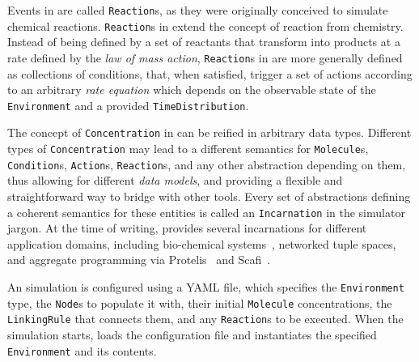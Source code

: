 Events in \alchemist{} are called \texttt{Reaction}s,
as they were originally conceived to simulate chemical reactions.
%
\texttt{Reaction}s in \alchemist{} extend the concept of reaction from chemistry.
%
Instead of being defined by a set of reactants that
transform into products at a rate defined by the \emph{law of mass action},
\texttt{Reaction}s in \alchemist{} are more generally defined as
collections of conditions, that, when satisfied,
trigger a set of actions according to an arbitrary \emph{rate equation}
which depends on the observable state of the \texttt{Environment}
and a provided \texttt{TimeDistribution}.

The concept of \texttt{Concentration} in \alchemist{} can be reified
in arbitrary data types.
Different types of \texttt{Concentration} may lead to a different semantics
for \texttt{Molecule}s, \texttt{Condition}s, \texttt{Action}s, \texttt{Reaction}s,
and any other abstraction depending on them,
thus allowing for different \emph{data models},
and providing a flexible and straightforward way to
bridge \alchemist{} with other tools.
%
Every set of abstractions defining a coherent semantics
for these entities is called an \texttt{Incarnation}
in the simulator jargon.
%
At the time of writing,
\alchemist{} provides several incarnations
for different application domains,
including
bio-chemical systems~\cite{MontagnaSAC2012},
networked tuple spaces\cite{zambonelli2015percom},
and aggregate programming via Protelis~\cite{PianiniSAC2015} and Scafi~\cite{DBLP:journals/softx/CasadeiVAP22}.

An \alchemist{} simulation is configured using a YAML file,
which specifies the \texttt{Environment} type,
the \texttt{Node}s to populate it with,
their initial \texttt{Molecule} concentrations,
the \texttt{LinkingRule} that connects them,
and any \texttt{Reaction}s to be executed.
%
When the simulation starts,
\alchemist{} loads the configuration file and instantiates
the specified \texttt{Environment} and its contents.

\paragraph{\jakta{}}
\label{par:jakta}

